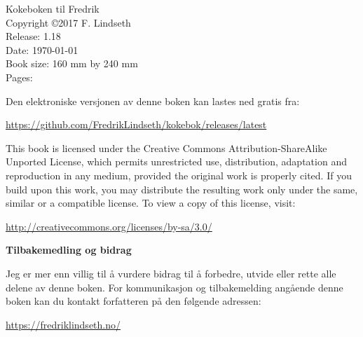 
\setcounter{page}{1}

{\footnotesize
\noindent
Kokeboken til Fredrik\\
Copyright \copyright 2017 F. Lindseth\\
Release: 1.18 \\ %
Date: \today\\
Book size: 160 mm by 240 mm\\
Pages: \\
\vspace{20pt}

\noindent
Den elektroniske versjonen av denne boken kan lastes ned gratis fra:

\noindent
\url{https://github.com/FredrikLindseth/kokebok/releases/latest}

\vspace{15pt}

\noindent

\noindent
This book is licensed under the Creative Commons Attribution-ShareAlike Unported License, which permits unrestricted use, distribution, adaptation and reproduction in any medium, provided the original work is properly cited. If you build upon this work, you may distribute the resulting work only under the same, similar or a compatible license. To view a copy of this license, visit:

\noindent
\url{http://creativecommons.org/licenses/by-sa/3.0/}
\vspace{25pt}

\noindent
{\sffamily\bfseries Tilbakemedling og bidrag}

\noindent
Jeg er mer enn villig til å vurdere bidrag til å forbedre, utvide eller rette alle delene av denne boken.
For kommunikasjon og tilbakemelding angående denne boken kan du kontakt forfatteren på den følgende adressen:

\noindent
\url{https://fredriklindseth.no/}\\

\vfill
\noindent

} %

